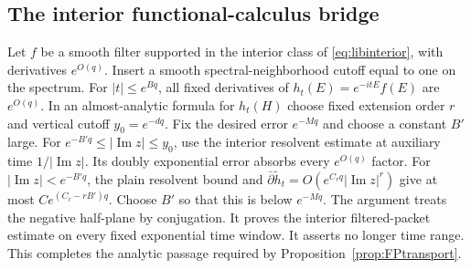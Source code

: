 \subsection{The interior functional-calculus bridge}

Let $f$ be a smooth filter supported in the interior class of
\eqref{eq:libinterior}, with derivatives $e^{O(q)}$.
Insert a smooth spectral-neighborhood cutoff equal to one on the
spectrum. For $|t|\le e^{Bq}$, all fixed derivatives of
$h_t(E)=e^{-itE}f(E)$ are $e^{O(q)}$.
In an almost-analytic formula for $h_t(H)$ choose fixed extension
order $r$ and vertical cutoff $y_0=e^{-dq}$.
Fix the desired error $e^{-Mq}$ and choose a constant $B'$ large.
For $e^{-B'q}\le|\operatorname{Im}z|\le y_0$, use the interior
resolvent estimate at auxiliary time $1/|\operatorname{Im}z|$.
Its doubly exponential error absorbs every $e^{O(q)}$ factor.
For $|\operatorname{Im}z|<e^{-B'q}$, the plain resolvent bound and
$\bar\partial\widetilde h_t=O(e^{C_rq}|\operatorname{Im}z|^r)$
give at most $Ce^{(C_r-rB')q}$.
Choose $B'$ so that this is below $e^{-Mq}$.
The argument treats the negative half-plane by conjugation.
It proves the interior filtered-packet estimate on every fixed
exponential time window. It asserts no longer time range.
This completes the analytic passage required by
Proposition~\ref{prop:FPtransport}.
